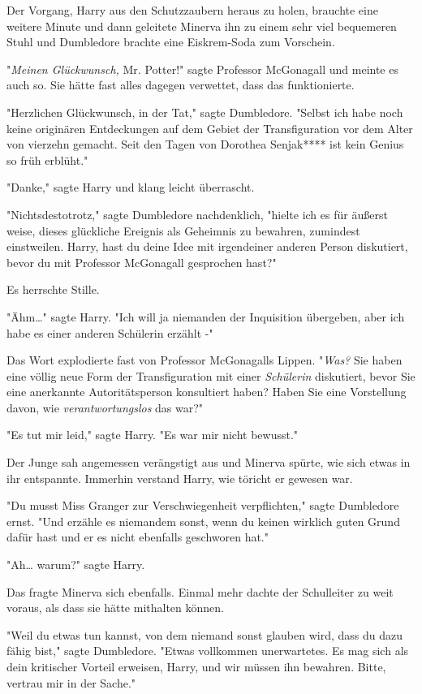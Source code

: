 {Der Vorgang, Harry aus den Schutzzaubern heraus zu holen, brauchte eine weitere Minute und dann geleitete Minerva ihn zu einem sehr viel bequemeren Stuhl und Dumbledore brachte eine Eiskrem-Soda zum Vorschein.

"\emph{Meinen Glückwunsch,} Mr. Potter!" sagte Professor McGonagall und meinte es auch so. Sie hätte fast alles dagegen verwettet, dass das funktionierte.

"Herzlichen Glückwunsch, in der Tat," sagte Dumbledore. "Selbst ich habe noch keine originären Entdeckungen auf dem Gebiet der Transfiguration vor dem Alter von vierzehn gemacht. Seit den Tagen von Dorothea Senjak**** ist kein Genius so früh erblüht."

"Danke," sagte Harry und klang leicht überrascht.

"Nichtsdestotrotz," sagte Dumbledore nachdenklich, "hielte ich es für äußerst weise, dieses glückliche Ereignis als Geheimnis zu bewahren, zumindest einstweilen. Harry, hast du deine Idee mit irgendeiner anderen Person diskutiert, bevor du mit Professor McGonagall gesprochen hast?"

Es herrschte Stille.

"Ähm…" sagte Harry. "Ich will ja niemanden der Inquisition übergeben, aber ich habe es einer anderen Schülerin erzählt -"

Das Wort explodierte fast von Professor McGonagalls Lippen. "\emph{Was?} Sie haben eine völlig neue Form der Transfiguration mit einer \emph{Schülerin} diskutiert, bevor Sie eine anerkannte Autoritätsperson konsultiert haben? Haben Sie eine Vorstellung davon, wie \emph{verantwortungslos} das war?"

"Es tut mir leid," sagte Harry. "Es war mir nicht bewusst."

Der Junge sah angemessen verängstigt aus und Minerva spürte, wie sich etwas in ihr entspannte. Immerhin verstand Harry, wie töricht er gewesen war.

"Du musst Miss Granger zur Verschwiegenheit verpflichten," sagte Dumbledore ernst. "Und erzähle es niemandem sonst, wenn du keinen wirklich guten Grund dafür hast und er es nicht ebenfalls geschworen hat."

"Ah… warum?" sagte Harry.

Das fragte Minerva sich ebenfalls. Einmal mehr dachte der Schulleiter zu weit voraus, als dass sie hätte mithalten können.

"Weil du etwas tun kannst, von dem niemand sonst glauben wird, dass du dazu fähig bist," sagte Dumbledore. "Etwas vollkommen unerwartetes. Es mag sich als dein kritischer Vorteil erweisen, Harry, und wir müssen ihn bewahren. Bitte, vertrau mir in der Sache."

}
